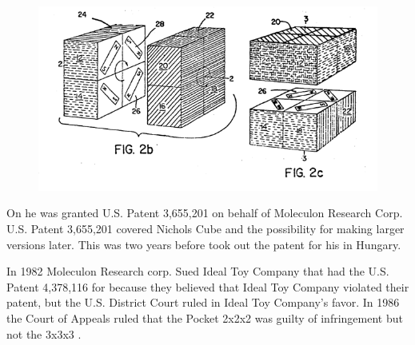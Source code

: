 \begin{figure}[hb]
	\centering
		\includegraphics[scale=0.6]{input/pics/Nicholspatent2.png}
	\caption{}
	\label{fig:Nicholspatent2}
\end{figure}

On  he was granted U.S. Patent 3,655,201 on behalf of Moleculon Research Corp. U.S. Patent 3,655,201 covered Nichols Cube and the possibility for making larger versions later. This was two years before \erno{} took out the patent for his \rubik{} in Hungary. 

In 1982 Moleculon Research corp.  Sued Ideal Toy Company that had the U.S. Patent 4,378,116 for \rubik{} because they believed that Ideal Toy Company violated their patent, but the U.S. District Court ruled in Ideal Toy Company's favor. In 1986 the Court of Appeals ruled that the Pocket \rubik{} 2x2x2 was guilty of infringement but not the 3x3x3 \rubik{}.

%